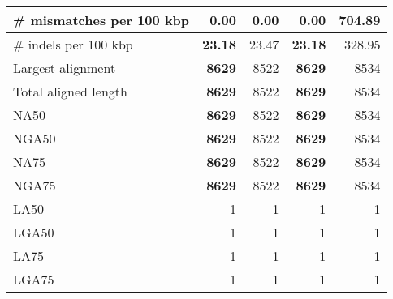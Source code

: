 \documentclass[12pt,a4paper]{article}
\begin{document}
\begin{table}[ht]
\begin{center}
\begin{tabular}{|l*{4}{|r}|}
\# mismatches per 100 kbp & {\bf 0.00} & {\bf 0.00} & {\bf 0.00} & 704.89 \\ \hline
\# indels per 100 kbp & {\bf 23.18} & 23.47 & {\bf 23.18} & 328.95 \\ \hline
Largest alignment & {\bf 8629} & 8522 & {\bf 8629} & 8534 \\ \hline
Total aligned length & {\bf 8629} & 8522 & {\bf 8629} & 8534 \\ \hline
NA50 & {\bf 8629} & 8522 & {\bf 8629} & 8534 \\ \hline
NGA50 & {\bf 8629} & 8522 & {\bf 8629} & 8534 \\ \hline
NA75 & {\bf 8629} & 8522 & {\bf 8629} & 8534 \\ \hline
NGA75 & {\bf 8629} & 8522 & {\bf 8629} & 8534 \\ \hline
LA50 & 1 & 1 & 1 & 1 \\ \hline
LGA50 & 1 & 1 & 1 & 1 \\ \hline
LA75 & 1 & 1 & 1 & 1 \\ \hline
LGA75 & 1 & 1 & 1 & 1 \\ \hline
\end{tabular}
\end{center}
\end{table}
\end{document}
